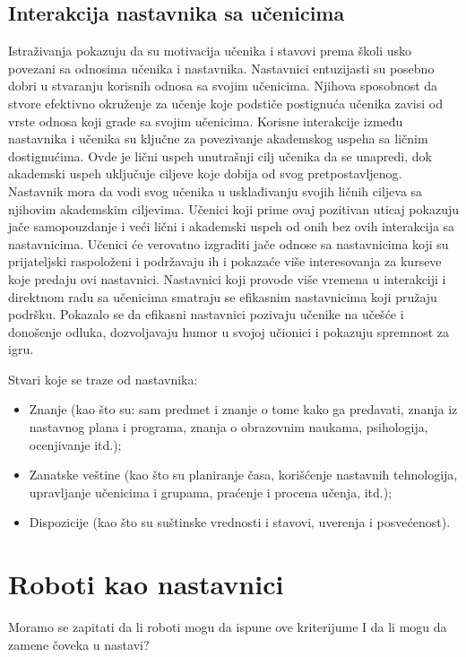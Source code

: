 \documentclass[a4paper]{article}
\begin{document}
\subsection{Interakcija nastavnika sa učenicima}
Istraživanja pokazuju da su motivacija učenika i stavovi prema školi usko povezani sa odnosima učenika i nastavnika. Nastavnici entuzijasti su posebno dobri u stvaranju korisnih odnosa sa svojim učenicima. Njihova sposobnost da stvore efektivno okruženje za učenje koje podstiče postignuća učenika zavisi od vrste odnosa koji grade sa svojim učenicima. Korisne interakcije između nastavnika i učenika su ključne za povezivanje akademskog uspeha sa ličnim dostignućima. Ovde je lični uspeh unutrašnji cilj učenika da se unapredi, dok akademski uspeh uključuje ciljeve koje dobija od svog pretpostavljenog. Nastavnik mora da vodi svog učenika u usklađivanju svojih ličnih ciljeva sa njihovim akademskim ciljevima. Učenici koji prime ovaj pozitivan uticaj pokazuju jače samopouzdanje i veći lični i akademski uspeh od onih bez ovih interakcija sa nastavnicima.
Učenici će verovatno izgraditi jače odnose sa nastavnicima koji su prijateljski raspoloženi i podržavaju ih i pokazaće više interesovanja za kurseve koje predaju ovi nastavnici. Nastavnici koji provode više vremena u interakciji i direktnom radu sa učenicima smatraju se efikasnim nastavnicima koji pružaju podršku. Pokazalo se da efikasni nastavnici pozivaju učenike na učešće i donošenje odluka, dozvoljavaju humor u svojoj učionici i pokazuju spremnost za igru.

Stvari koje se traze od nastavnika:
\begin{itemize}
\item{} Znanje (kao što su: sam predmet i znanje o tome kako ga predavati, znanja iz nastavnog plana i programa, znanja o obrazovnim naukama, psihologija, ocenjivanje itd.);
\item{} Zanatske veštine (kao što su planiranje časa, korišćenje nastavnih tehnologija, upravljanje učenicima i grupama, praćenje i procena učenja, itd.);
\item{} Dispozicije (kao što su suštinske vrednosti i stavovi, uverenja i posvećenost).
\end{itemize}

\section{Roboti kao nastavnici}
Moramo se zapitati da li roboti mogu da ispune ove kriterijume I da li mogu da zamene čoveka u nastavi?
\end{document}
